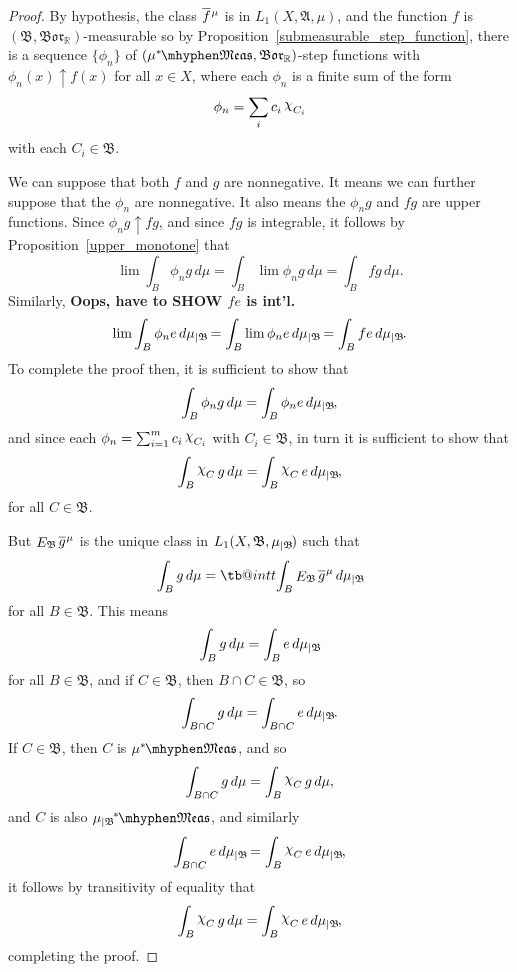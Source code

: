 \documentclass[
twoside=true,
paper=letter,
fontsize=9pt,
pagesize=auto,
leqno,
openany,
headsepline,
overfullrule,
]{scrbook}
\makeatletter
\theoremstyle{plain}
\theoremstyle{plain}
\theoremstyle{definition}
\theoremstyle{bfnoteitalic}
\theoremstyle{bfnoteroman}
\newcommand{\sigalg}[1]{\mathfrak{#1}}
\newcommand{\kondexpsub}[2]
{\mathop{E}\nolimits_{#2}\hspace{-1pt}#1}
\newcommand{\borel}{\mathfrak{Bor}}
\newcommand{\charfunction}[1]{\mathop{{\raisebox{2pt}{$\chi$}}_{#1}}}
\newcommand{\restrictedto}[1]{_{\lvert#1}\kern-1.5pt}
\newcommand{\R}{\mathbb{R}}
\newcommand{\meets}{\cap}
\newcommand{\sigmaalgebra}{\sigalg{A}}
\newcommand{\sigmaalgebraii}{\sigalg{B}}
\newcommand{\measurable}[1]{{#1}\mhyphen\mathfrak{Meas}}
\newcommand{\kernast}{\ast\kern-1pt}
\newcommand{\funcf}{f}
\newcommand{\funcg}{g}
\newcommand{\functionii}{g}
\newcommand{\measurespace}{X}
\newcommand{\measure}{\mu}
\newcommand{\measmu}{\mu}
\newcommand{\setii}{B}
\newcommand{\setiii}{C}
\newcommand*\xbar[1]{%
   \hbox{%
     \vbox{%
       \hrule height 0.4pt %
       \kern0.4ex%
       \hbox{%
         \ensuremath{#1}%
       }%
     }%
   }%
}
\newcommand\tint{\mathop{\mathpalette\tb@int{t}}\!\int}
\newcommand\tb@int[2]{%
  \sbox\z@{$\m@th#1\int$}%
  \if#2t%
    \rlap{\hbox to\wd\z@{%
      \hfil
      \vrule width .35em height \dimexpr\ht\z@+1.4pt\relax depth -\dimexpr\ht\z@+1pt\relax
      \kern.05em %
    }}
  \else
    \rlap{\hbox to\wd\z@{%
      \vrule width .35em height -\dimexpr\dp\z@+1pt\relax depth \dimexpr\dp\z@+1.4pt\relax
      \hfil
    }}
  \fi
}
\newcommand{\lebclass}[1]{\hspace{.5pt}\xbar{#1}\hspace{0.5pt}}
\newcommand{\ellclass}[2]{\lebclass{#1}^{#2}}
\newcommand{\inducedint}{\tint}
\makeatother
\begin{document}
\begin{proof}
By hypothesis, the class
$\ellclass{\funcf}{\measmu}$
is in
$L_1(\measurespace, \sigmaalgebra,\measmu)$,
and the function
$\funcf$ is
$(\sigmaalgebraii, \borel_\R)$\hyp{}measurable
so by Proposition~\ref{submeasurable_step_function}, there is a sequence
$\{ \phi_n \}$ of
$(\measurable{\measmu^\kernast}, \borel_\R)$\hyp{}step functions with
$\phi_n(x) \uparrow f(x)$ for all $x\in\measurespace$, where each $\phi_n$ is a finite sum of the form
\[
\phi_n = \sum_i c_i \charfunction{\setiii_i}
\]
with each $\setiii_i \in \sigmaalgebraii$.


We can suppose that both $\funcf$ and $\funcg$ are nonnegative.
It means we can further suppose that the $\phi_n$ are nonnegative.
It also means the $\phi_n g$ and $\funcf \funcg$ are upper functions.
Since
$\phi_n \funcg \uparrow \funcf \funcg$,
and since $\funcf\funcg$ is integrable,
it follows by Proposition~\ref{upper_monotone}
that
\[
\lim \int_\setii \phi_n \funcg\, d\measmu
=
\int_\setii \lim \phi_n\funcg \, d\measmu
=
\int_\setii \funcf \funcg \, d\measmu .
\]
Similarly, \textbf{Oops, have to SHOW $fe$ is int'l.}
\[
\lim \int_\setii \phi_n e \, d\measmu\restrictedto{\sigmaalgebraii}
=
\int_\setii \lim \phi_n e \, d\measmu\restrictedto{\sigmaalgebraii}
=
\int_\setii \funcf e \, d\measmu\restrictedto{\sigmaalgebraii} .
\]
To complete the proof then, it is sufficient to show that
\[
\int_\setii \phi_n \funcg \, d\measmu
=
\int_\setii \phi_n e \, d\measmu\restrictedto{\sigmaalgebraii},
\]
and since each
$\phi_n = \sum_{i=1}^m c_i \charfunction{\setiii_i}$ with
$\setiii_i\in\sigmaalgebraii$,
in turn it is sufficient to show that
\[
\int_\setii \charfunction{\setiii} \funcg \, d\measmu
=
\int_\setii \charfunction{\setiii} e \, d\measmu\restrictedto{\sigmaalgebraii},
\]
for all $\setiii\in\sigmaalgebraii$.

But
$\kondexpsub{\ellclass{\functionii}{\measure}}{\sigmaalgebraii}$
is the unique class in
$L_1(\measurespace, \sigmaalgebraii, \measmu\restrictedto{\sigmaalgebraii})$
such that
\[
\int_\setii \funcg \, d\measmu
=
\inducedint_\setii
\kondexpsub{\ellclass{\functionii}{\measure}}{\sigmaalgebraii}
\, d\measmu\restrictedto{\sigmaalgebraii}
\]
for all $\setii\in\sigmaalgebraii$.
This means
\[
\int_\setii \funcg \, d\measmu
=
\int_\setii
e
\, d\measmu\restrictedto{\sigmaalgebraii}
\]
for all $\setii\in\sigmaalgebraii$,
and if $\setiii\in\sigmaalgebraii$, then $\setii\meets\setiii\in\sigmaalgebraii$, so
\[
\int_{\setii\meets\setiii} \funcg \, d\measmu
=
\int_{\setii\meets\setiii}
e
\, d\measmu\restrictedto{\sigmaalgebraii}.
\]
If $\setiii\in\sigmaalgebraii$, then $\setiii$ is
$\measurable{\measmu^\kernast}$, and so
\[
\int_{\setii\meets\setiii} \funcg \, d\measmu
=
\int_\setii \charfunction{\setiii} \funcg \, d\measmu ,
\]
and $\setiii$ is also
$\measurable{\measmu\restrictedto{\sigmaalgebraii}^\kernast}$, and similarly
\[
\int_{\setii\meets\setiii}
e
\, d\measmu\restrictedto{\sigmaalgebraii}
=
\int_{\setii}
\charfunction{\setiii} e
\, d\measmu\restrictedto{\sigmaalgebraii} ,
\]
it follows by transitivity of equality that
\[
\int_\setii \charfunction{\setiii} \funcg \, d\measmu
=
\int_\setii \charfunction{\setiii} e \, d\measmu\restrictedto{\sigmaalgebraii},
\]
completing the proof.


\end{proof}
\end{document}
